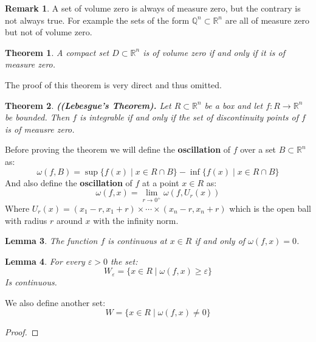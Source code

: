 \documentclass[11pt,a4paper]{article}
\theoremstyle{definition}
\newtheorem{remark}{Remark}[section]
\theoremstyle{plain}
\newtheorem{theorem}{Theorem}[section]
\newtheorem{lemma}[theorem]{Lemma}
\newcommand{\Q}{\mathbb{Q}}
\newcommand{\R}{\mathbb{R}}
\begin{document}
	\begin{remark}
		A set of volume zero is always of measure zero, but the
		contrary is not always true. For example the sets of the
		form $\Q^n \subset \R^n$ are all of measure zero but not
		of volume zero.
	\end{remark}
	\begin{theorem}
		A compact set $D \subset \R^n$ is of volume zero if and only
		if it is of measure zero.
	\end{theorem}
	The proof of this theorem is very direct and thus omitted.
	\begin{theorem}
		\textnormal{\textbf{((Lebesgue's Theorem).}} Let $R \subset \R^n$ be 
		a box and let $f \colon R \to \R^n$ be bounded. Then $f$ is integrable
		if and only if the set of discontinuity points of $f$ is of 
		meausre zero.
	\end{theorem}
	\noindent
	Before proving the theorem we will define the \textbf{oscillation}
	of $f$ over a set $B \subset \R^n$ as:
	\[
		\omega(f,B) = 
		\sup\{f(x) \mid x \in R \cap B\} -
		\inf\{f(x) \mid x \in R \cap B\}
	\]
	And also define the \textbf{oscillation} of $f$ at a point 
	$x \in R$ as:
	\[
		\omega(f,x) = \lim_{r \to 0^+}{\omega(f,U_r(x))}
	\]
	Where $U_r(x) = (x_1-r,x_1+r) \times \cdots \times (x_n-r,x_n+r)$
	which is the open ball with radius $r$ around $x$ with the
	infinity norm.
	\begin{lemma}
		The function $f$ is continuous at $x \in R$ if and only of
		$\omega(f,x) = 0$.
	\end{lemma}
	\begin{lemma}
		For every $\varepsilon > 0$ the set:
		\[
			W_\varepsilon = 
			\{x \in R \mid \omega(f,x) \geq \varepsilon\}
		\]
		Is continuous.
	\end{lemma}
	We also define another set:
	\[
		W = \{x \in R \mid \omega(f,x) \neq 0\}		
	\]
	\begin{proof}
	\end{proof}
	
\end{document}
